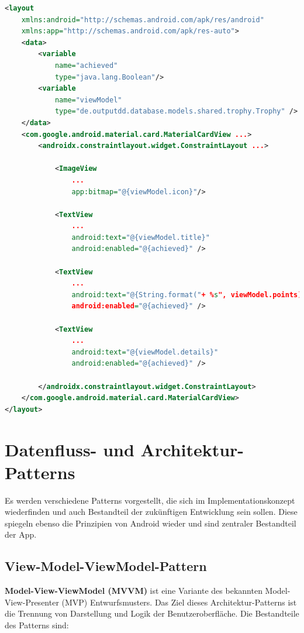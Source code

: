 \begin{lstlisting}[language=XML, caption={Databinding am Beispiel einer Trophäe in der Spielansicht.}, label={lst:databinding}]
<layout 
    xmlns:android="http://schemas.android.com/apk/res/android"
    xmlns:app="http://schemas.android.com/apk/res-auto">
    <data>
        <variable
            name="achieved"
            type="java.lang.Boolean"/>
        <variable
            name="viewModel"
            type="de.outputdd.database.models.shared.trophy.Trophy" />
    </data>
    <com.google.android.material.card.MaterialCardView ...>
        <androidx.constraintlayout.widget.ConstraintLayout ...>

            <ImageView 
                ... 
                app:bitmap="@{viewModel.icon}"/>

            <TextView
                ...
                android:text="@{viewModel.title}"
                android:enabled="@{achieved}" />

            <TextView
                ...
                android:text="@{String.format("+ %s", viewModel.points)}"
                android:enabled="@{achieved}" />

            <TextView
                ...
                android:text="@{viewModel.details}"
                android:enabled="@{achieved}" />

        </androidx.constraintlayout.widget.ConstraintLayout>
    </com.google.android.material.card.MaterialCardView>
</layout>
\end{lstlisting}

\newpage

\section{Datenfluss- und Architektur-Patterns}

Es werden verschiedene Patterns vorgestellt, die sich im Implementationskonzept wiederfinden und auch Bestandteil der zukünftigen Entwicklung sein sollen. Diese spiegeln ebenso die Prinzipien von Android wieder und sind zentraler Bestandteil der App.

\subsection{View-Model-ViewModel-Pattern}

\textbf{Model-View-ViewModel (MVVM)} ist eine Variante des bekannten Model-View-Presenter (MVP) Entwurfsmusters. Das Ziel dieses Architektur-Patterns ist die Trennung von Darstellung und Logik der Benutzeroberfläche. Die Bestandteile des Patterns sind:

